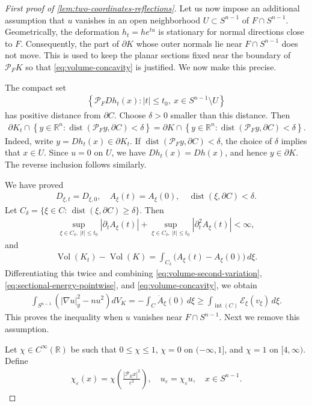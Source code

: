 \documentclass[12pt]{amsart}
\newcommand{\R}{\mathbb{R}}
\newcommand{\Sn}{S^{n-1}}
\newcommand{\eq}[1]{\begin{equation}\begin{alignedat}{2}#1\end{alignedat}\end{equation}}
\theoremstyle{plain}
\theoremstyle{definition}
\theoremstyle{remark}
\numberwithin{equation}{section}
\begin{document}
\begin{proof}[First proof of \autoref{lem:two-coordinates-reflections}]
Let us now impose an additional assumption that $u$ vanishes  in an open neighborhood $U\subset \Sn$ of $F\cap\Sn$. Geometrically, the deformation $h_t=he^{tu}$ is stationary for normal directions close to $F$. Consequently, the part of $\partial K$ whose outer normals lie near $F\cap\Sn$ does not move. This is used to keep the planar sections fixed near the boundary of $\mathcal{P}_{F}K$ so that \eqref{eq:volume-concavity} is justified. We now make this precise.


The compact set
\eq{
 \left\{\mathcal{P}_{F}Dh_t(x):|t|\leq t_0,\ x\in\Sn\setminus U\right\}
}
has positive distance from $\partial C $. Choose $\delta>0$ smaller than this distance. Then
\eq{
 \partial K_t\cap
 \left\{y\in\R^n:\operatorname{dist}(\mathcal{P}_{F}y,\partial C)<\delta\right\}
 =\partial K\cap\left\{y\in\R^n:\operatorname{dist}(\mathcal{P}_{F}y,\partial C)<\delta\right\}.
}
Indeed, write $y=Dh_t(x)\in\partial K_t$. If $\operatorname{dist}(\mathcal{P}_Fy,\partial C)<\delta$, the choice of $\delta$ implies that $x\in U$. Since $u=0$ on $U$, we have $Dh_t(x)=Dh(x)$, and hence $y\in\partial K$. The reverse inclusion follows similarly.

We have proved
\eq{
 D_{\xi,t}=D_{\xi,0},\quad A_{\xi}(t)=A_{\xi}(0),\quad \operatorname{dist}(\xi,\partial C)<\delta.
}
Let $C_{\delta}=\{\xi\in C:\,\operatorname{dist}(\xi,\partial C)\geq\delta\}$. Then
\eq{
 \sup_{\xi\in C_{\delta},\ |t|\leq t_0}
 \left|\partial_tA_{\xi}(t)\right|+ \sup_{\xi\in C_{\delta},\ |t|\leq t_0}
 \left|\partial_t^2A_{\xi}(t)\right|<\infty,
}
and
\eq{
 \operatorname{Vol}(K_t)-\operatorname{Vol}(K)
 =\int_{C_{\delta}}\big(A_{\xi}(t)-A_{\xi}(0)\big)\,d\xi.
}
Differentiating this twice and combining \eqref{eq:volume-second-variation}, \eqref{eq:sectional-energy-pointwise}, and \eqref{eq:volume-concavity}, we obtain
\eq{\label{eq:sectional-energy-integrated}
 \int_{\Sn}\left(|\nabla u|_g^2-nu^2\right)dV_K
 =-\int_C \ddot{A}_{\xi}(0)\,d\xi
 \geq\int_{\operatorname{int}(C)}\mathcal{E}_{\xi}(v_{\xi})\,d\xi.
}
This proves the inequality when $u$ vanishes near $F\cap\Sn$. Next we remove this assumption. 

Let $\chi\in C^{\infty}(\R)$ be such that $0\leq\chi\leq1$, $\chi=0$ on $(-\infty,1]$, and $\chi=1$ on $[4,\infty)$. Define
\eq{
 \chi_{\varepsilon}(x) =\chi\left(\frac{|\mathcal{P}_{E}x|^2}{\varepsilon^2}\right),
 \quad u_{\varepsilon}=\chi_{\varepsilon} u,\quad x\in \Sn.
}



\end{proof}
\end{document}
